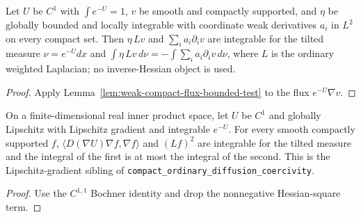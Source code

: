\begin{lemma}
  \label{lem:weak-ordinary-diffusion-pairing}
  \leanok
  Let $U$ be $C^1$ with $\int e^{-U}=1$, $v$ be smooth and compactly supported, and $\eta$ be globally bounded and locally integrable with
  coordinate weak derivatives $a_i$ in $L^2$ on every compact set. Then $\eta\,Lv$ and $\sum_ia_i\partial_iv$ are integrable for the
  tilted measure $\nu=e^{-U}dx$ and $\int\eta\,Lv\,d\nu=-\int\sum_ia_i\partial_iv\,d\nu$, where $L$ is the ordinary weighted Laplacian; no
  inverse-Hessian object is used.
\end{lemma}
\begin{proof}
  \leanok
  Apply Lemma~\ref{lem:weak-compact-flux-bounded-test} to the flux $e^{-U}\nabla v$.
\end{proof}

\begin{lemma}
  \label{lem:ordinary-diffusion-coercivity-lipschitz}
  \leanok
  On a finite-dimensional real inner product space, let $U$ be $C^1$ and globally Lipschitz with Lipschitz gradient and integrable
  $e^{-U}$. For every smooth compactly supported $f$, $\langle D(\nabla U)\nabla f,\nabla f\rangle$ and $(Lf)^2$ are integrable for the
  tilted measure and the integral of the first is at most the integral of the second. This is the Lipschitz-gradient sibling of
  \texttt{compact\_ordinary\_diffusion\_coercivity}.
\end{lemma}
\begin{proof}
  \leanok
  Use the $C^{1,1}$ Bochner identity and drop the nonnegative Hessian-square term.
\end{proof}

